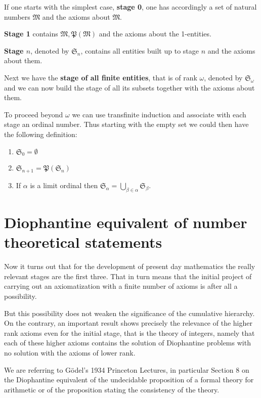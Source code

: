 \documentclass[12pt]{article}
\begin{document}
If one starts with the simplest case, \textbf{stage 0}, one has accordingly a set of natural numbers $\mathfrak{M}$ and the axioms about $\mathfrak{M}$.

\textbf{Stage 1} contains $\mathfrak{M}, \mathfrak{P} (\mathfrak{M})$ and the axioms about the 1-entities.

\textbf{Stage $n$}, denoted by $\mathfrak{S}_{n}$, contains all entities built up to stage $n$ and the axioms about them.

Next we have the \textbf{stage of all finite entities}, that is of rank $\omega$, denoted by $\mathfrak{S}_{\omega}$ and we can now build the stage of all its subsets together with the axioms about them.

To proceed beyond $\omega$ we can use transfinite induction and associate with each stage an ordinal number. Thus starting with the empty set we could then have the following definition:

\begin{enumerate}
\item \qquad $\mathfrak{S}_{0} = \emptyset$

\item \qquad $\mathfrak{S}_{n+1} = \mathfrak{P} (\mathfrak{S}_{n})$

\item \qquad If $\alpha$ is a limit ordinal then $\mathfrak{S}_{\alpha} = \bigcup \limits _{\beta \in \alpha}{\mathfrak{S}_{\beta}}$.
\end{enumerate}

\section{Diophantine equivalent of number theoretical statements}\normalsize

Now it turns out that for the development of present day mathematics the really relevant stages are the first three. That in turn means that the initial project of carrying out an axiomatization with a finite number of axioms is after all a possibility.

But this possibility does not weaken the significance of the cumulative hierarchy. On the contrary, an important result shows precisely the relevance of the higher rank axioms even for the initial stage, that is the theory of integers, namely that each of these higher axioms contains the solution of Diophantine problems with no solution with the axioms of lower rank.

We are referring to G\"{o}del's 1934 Princeton Lectures, in particular Section 8 on the Diophantine equivalent of the undecidable proposition of a formal theory for arithmetic or of the proposition stating the consistency of the theory. 
\end{document}
